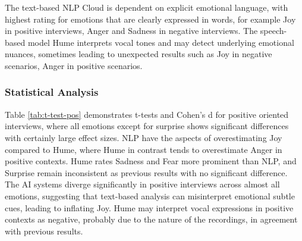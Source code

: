 The text-based NLP Cloud is dependent on explicit emotional language, with highest rating for emotions that are clearly 
expressed in words, for example Joy in positive interviews, Anger and Sadness in negative interviews. 
The speech-based model Hume interprets vocal tones and may detect underlying emotional nuances, sometimes leading to unexpected results such 
as Joy in negative scenarios, Anger in positive scenarios. 

\subsubsection{Statistical Analysis}

Table \ref{tab:t-test-pos} demonstrates t-tests and Cohen's d for positive oriented interviews, where all emotions except for surprise shows significant differences 
with certainly large effect sizes. NLP have the aspects of overestimating Joy compared to Hume, where Hume in contrast tends to overestimate Anger in positive contexts. 
Hume rates Sadness and Fear more prominent than NLP, and Surprise remain inconsistent as previous results with no significant difference. 
The AI systems diverge significantly in positive interviews across almost all emotions, suggesting that text-based analysis can misinterpret 
emotional subtle cues, leading to inflating Joy. Hume may interpret vocal expressions in positive contexts as negative, probably due to the nature of the recordings, 
in agreement with previous results. 

